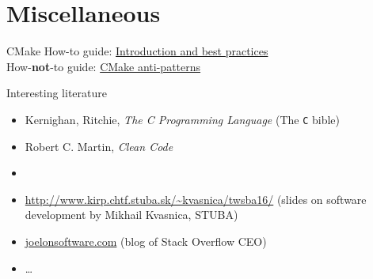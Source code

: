 \documentclass[10pt]{beamer}
\begin{document}
\section{Miscellaneous}

\begin{frame}{CMake}
	How-to guide: \hyperlink{http://www.slideshare.net/DanielPfeifer1/cmake-48475415}{Introduction and best practices} \\ \vspace{1cm}
	How-\textbf{not}-to guide: \hyperlink{http://voices.canonical.com/jussi.pakkanen/2013/03/26/a-list-of-common-cmake-antipatterns/}{CMake anti-patterns}
\end{frame}

\begin{frame}{Interesting literature}
	\begin{itemize}
		\item Kernighan, Ritchie, \emph{The C Programming Language}	(The \texttt{C} bible)	
		\item Robert C. Martin, \emph{Clean Code}
		\item 
		\item \url{http://www.kirp.chtf.stuba.sk/~kvasnica/twsba16/} (slides on software development by Mikhail Kvasnica, STUBA)
		\item \url{joelonsoftware.com} (blog of Stack Overflow CEO)
		\item \ldots
	\end{itemize}
\end{frame}


\end{document}
